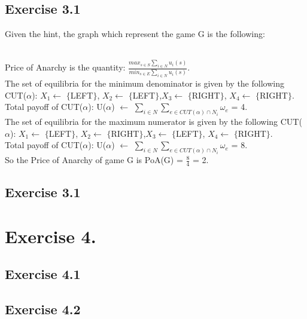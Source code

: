 \documentclass[11pt]{scrartcl}
\begin{document}
\subsection{Exercise 3.1}
Given the hint, the graph which represent the game G is the following:\\
\\
Price of Anarchy is the quantity: $\frac{max_{s \in S} \sum_{i\in N} u_i(s)}{min_{s \in E} \sum_{i\in N} u_i(s)}$.\\
The set of equilibria for the minimum denominator is given by the following CUT($\alpha$): $X_1\gets$ $\{$LEFT$\}$, $X_2\gets$ $\{$LEFT$\}$,$X_3\gets$ $\{$RIGHT$\}$, $X_4\gets$ $\{$RIGHT$\}$.\\
Total payoff of CUT($\alpha$):  U($\alpha$) $\gets$ $\sum_{i \in N} $$\sum_{e \in CUT(\alpha)\cap N_i}{\omega_e}$ = 4.\\
The set of equilibria for the maximum numerator is given by the following CUT($\alpha$): $X_1\gets$ $\{$LEFT$\}$, $X_2\gets$ $\{$RIGHT$\}$,$X_3\gets$ $\{$LEFT$\}$, $X_4\gets$ $\{$RIGHT$\}$.\\
Total payoff of CUT($\alpha$):  U($\alpha$) $\gets$ $\sum_{i \in N} $$\sum_{e \in CUT(\alpha)\cap N_i}{\omega_e}$ = 8.\\
So the Price of Anarchy of game G is PoA(G) = $\frac{8}{4}$ = 2.
\subsection{Exercise 3.1}
\section{Exercise 4.}
\subsection{Exercise 4.1}
\vspace{-0.2cm}
\subsection{Exercise 4.2}
\vspace{-0.4cm}
\end{document}
